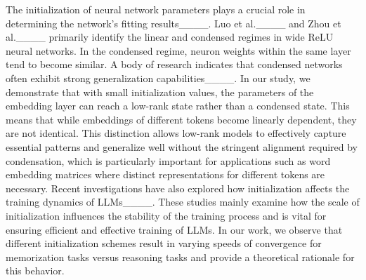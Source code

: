 The initialization of neural network parameters plays a crucial role in determining the network's fitting results____. Luo et al.____ and Zhou et al.____ primarily identify the linear and condensed regimes in wide ReLU neural networks. In the condensed regime, neuron weights within the same layer tend to become similar. A body of research indicates that condensed networks often exhibit strong generalization capabilities____. In our study, we demonstrate that with small initialization values, the parameters of the embedding layer can reach a low-rank state rather than a condensed state. This means that while embeddings of different tokens become linearly dependent, they are not identical. This distinction allows low-rank models to effectively capture essential patterns and generalize well without the stringent alignment required by condensation, which is particularly important for applications such as word embedding matrices where distinct representations for different tokens are necessary. Recent investigations have also explored how initialization affects the training dynamics of LLMs____. These studies mainly examine how the scale of initialization influences the stability of the training process and is vital for ensuring efficient and effective training of LLMs. In our work, we observe that different initialization schemes result in varying speeds of convergence for memorization tasks versus reasoning tasks and provide a theoretical rationale for this behavior.